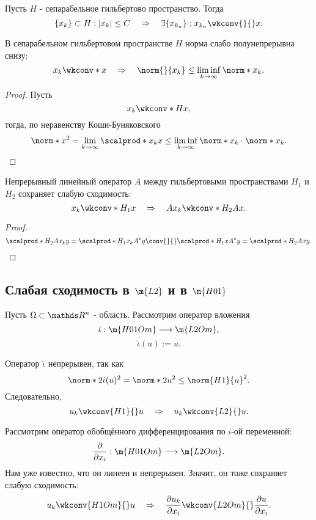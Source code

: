 \begin{note} Пусть $H$ - сепарабельное гильбертово пространство. Тогда
$$ \{ x_k \} \subset H : |x_k| \leq C \quad \Rightarrow \quad \exists \{ x_{k_n} \} : x_{k_n} \wkconv{}{} x.$$
\end{note}

\begin{note} В сепарабельном гильбертовом пространстве $H$ норма слабо полунепрерывна снизу:
$$x_k \wkconv*{}{} x \quad \Rightarrow \quad \norm{}{x_k} \leq \liminf_{k \to \infty} \norm*{}{x_k}.$$
\end{note}
\begin{proof}
Пусть 
$$ x_k \wkconv*{H}{} x,$$
тогда, по неравенству Коши-Буняковского
$$ \norm*{}{x}^2 = \lim_{k \to \infty} \scalprod*{}{x_k}{x} \leq \liminf_{k \to \infty} \norm*{}{x_k} \cdot \norm*{}{x_k}.$$
\end{proof}


\begin{note} Непрерывный линейный оператор $A$ между гильбертовыми пространствами $H_1$ и $H_2$  сохраняет слабую сходимость:
$$ x_k \wkconv*{H_1}{} x \quad \Rightarrow \quad Ax_k \wkconv*{H_2}{} Ax.$$
\end{note}
\begin{proof}
$$ \scalprod*{H_2}{A x_k} {y} = \scalprod*{H_1}{x_k}{A^*y} \conv{}{} \scalprod*{H_1}{x}{A^*y} = \scalprod*{H_2}{Ax}{y}.$$

\end{proof}

\subsection{Слабая сходимость в $\m{L2}$ и в $\m{H01}$}
Пусть $\Omega \subset \real^n$ - область. Рассмотрим оператор вложения
$$\dot{\iota} : \m{H01Om} \longrightarrow \m{L2Om},$$
$$\dot{\iota}(u) := u.$$

Оператор $\dot{\iota}$ непрерывен, так как
$$ \norm*{2}{\dot{\iota}}(u)^2 = \norm*{2}{u}^2 \leq \norm{H1}{u}^2.$$
Следовательно,
$$ u_k \wkconv{H1}{} u \quad \Rightarrow \quad u_k \wkconv{L2}{} u.$$

Рассмотрим оператор обобщённого дифференцирования по $i$-ой переменной:
$$ \pder{x_i} : \m{H01Om} \longrightarrow \m{L2Om}.$$
Нам уже известно, что он линеен и непрерывен. Значит, он тоже сохраняет слабую сходимость:
$$ u_k \wkconv{H1Om}{} u \quad \Rightarrow \quad \pder[u_k]{x_i} \wkconv{L2Om}{} \pder[u]{x_i}.$$

